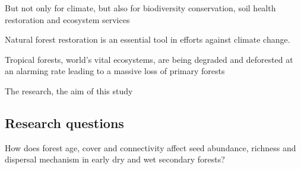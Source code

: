 But not only for climate, but also for biodiversity conservation, soil health restoration and ecosystem services

Natural forest restoration is an essential tool in efforts against climate change.

Tropical forests, world's vital ecosystems, are being degraded and deforested at an alarming rate leading to a massive loss of primary forests


The research, the aim of this study


\subsection{Research questions}

How does forest age, cover and connectivity affect seed abundance, richness and dispersal mechanism in early dry and wet secondary forests?